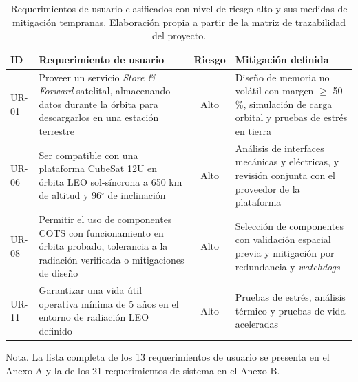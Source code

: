 %


\begin{table}[H]
\centering
\begin{threeparttable}
\caption{Requerimientos de usuario clasificados con nivel de riesgo
alto y sus medidas de mitigación tempranas. Elaboración propia a partir de la
matriz de trazabilidad del proyecto.\vspace{1ex}}
\small
\begin{tabularx}{\textwidth}{@{}l X c X@{}}
\toprule
\textbf{ID} & \textbf{Requerimiento de usuario} & \textbf{Riesgo} & \textbf{Mitigación definida} \\
\midrule
UR-01 & Proveer un servicio \textit{Store \& Forward} satelital, almacenando datos
durante la órbita para descargarlos en una estación terrestre & Alto &
Diseño de memoria no volátil con margen $\geq$ 50\,\%, simulación de carga orbital
y pruebas de estrés en tierra \\
\addlinespace
UR-06 & Ser compatible con una plataforma CubeSat 12U en órbita LEO sol-síncrona
a 650 km de altitud y 96$^{\circ}$ de inclinación & Alto &
Análisis de interfaces mecánicas y eléctricas, y revisión conjunta con el
proveedor de la plataforma \\
\addlinespace
UR-08 & Permitir el uso de componentes COTS con funcionamiento en órbita probado,
tolerancia a la radiación verificada o mitigaciones de diseño & Alto &
Selección de componentes con validación espacial previa y mitigación por
redundancia y \textit{watchdogs} \\
\addlinespace
UR-11 & Garantizar una vida útil operativa mínima de 5 años en el entorno de
radiación LEO definido & Alto &
Pruebas de estrés, análisis térmico y pruebas de vida aceleradas \\
\bottomrule
\end{tabularx}
\begin{tablenotes}[flushleft]\footnotesize
\item Nota. La lista completa de los 13 requerimientos de usuario se presenta en
el Anexo A y la de los 21 requerimientos de sistema en el Anexo B.
\end{tablenotes}
\end{threeparttable}
\end{table}

